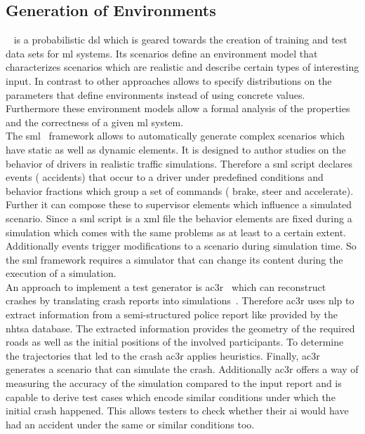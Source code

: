 \subsection{Generation of Environments}
\scenic{}~\cite{scenic} is a probabilistic \gls{dsl} which is geared towards the creation of training and test data sets for \gls{ml} systems.
Its scenarios define an environment model that characterizes scenarios which are \eg{} realistic and describe certain types of interesting input.
In contrast to other approaches \scenic{} allows to specify distributions on the parameters that define environments instead of using concrete values.
Furthermore these environment models allow a formal analysis of the properties and the correctness of a given \gls{ml} system.\\
The \gls{sml}~\cite{sml} framework allows to automatically generate complex scenarios which have static as well as dynamic elements.
It is designed to author studies on the behavior of drivers in realistic traffic simulations.
Therefore a \gls{sml} script declares events (\eg{} accidents) that occur to a driver under predefined conditions and behavior fractions which group a set of commands (\eg{} brake, steer and accelerate).
Further it can compose these to supervisor elements which influence a simulated scenario.
Since a \gls{sml} script is a \gls{xml} file the behavior elements are fixed during a simulation which comes with the same problems as \openscenario{} at least to a certain extent.
Additionally events trigger modifications to a scenario during simulation time.
So the \gls{sml} framework requires a simulator that can change its content during the execution of a simulation.\\
An approach to implement a test generator is \gls{ac3r}~\cite{ac3r} which can reconstruct crashes by translating crash reports into simulations~\cite{crashReconstruction}.
Therefore \gls{ac3r} uses \gls{nlp} to extract information from a semi-structured police report like provided by the \gls{nhtsa} database.
The extracted information provides the geometry of the required roads as well as the initial positions of the involved participants.
To determine the trajectories that led to the crash \gls{ac3r} applies heuristics.
Finally, \gls{ac3r} generates a \beamng{} scenario that can simulate the crash.
Additionally \gls{ac3r} offers a way of measuring the accuracy of the simulation compared to the input report and is capable to derive test cases which encode similar conditions under which the initial crash happened.
This allows testers to check whether their \gls{ai} would have had an accident under the same or similar conditions too.\\
